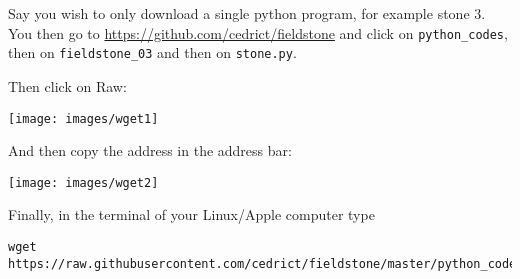 
Say you wish to only download a single python program, for example stone 3. You then go to 
\url{https://github.com/cedrict/fieldstone} and click on {\tt python\_codes}, then on {\tt fieldstone\_03} and
then on {\tt stone.py}.

Then click on Raw:

\begin{center}
\texttt{[image: images/wget1]} 
\end{center}

And then copy the address in the address bar:

\begin{center}
\texttt{[image: images/wget2]} 
\end{center}

Finally, in the terminal of your Linux/Apple computer type

\begin{verbatim}
wget https://raw.githubusercontent.com/cedrict/fieldstone/master/python_codes/fieldstone_03/stone.py
\end{verbatim}

